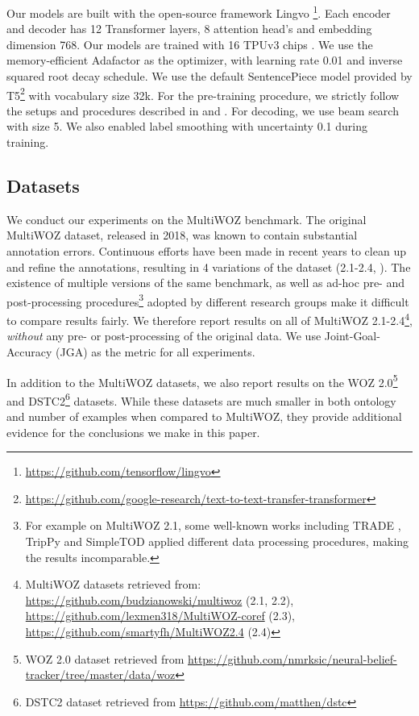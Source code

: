\documentclass[11pt]{article}
\begin{document}
Our models are built with the open-source framework Lingvo \cite{shen2019lingvo}\footnote{\url{https://github.com/tensorflow/lingvo}}. Each encoder and decoder has 12 Transformer layers, 8 attention head's and embedding dimension 768. Our models are trained with 16 TPUv3 chips \cite{jouppi17indata}. We use the memory-efficient Adafactor \cite{pmlr-v80-shazeer18a} as the optimizer, with learning rate 0.01 and inverse squared root decay schedule. We use the default SentencePiece model provided by T5\footnote{\url{https://github.com/google-research/text-to-text-transfer-transformer}} with vocabulary size 32k. For the pre-training procedure, we strictly follow the setups and procedures described in \cite{zhang20ae} and \cite{raffel20exploring}.
For decoding, we use beam search with size 5. We also enabled label smoothing with uncertainty 0.1 during training.

\subsection{Datasets}

We conduct our experiments on the MultiWOZ \cite{budzianowski-etal-2018-multiwoz} benchmark. The original MultiWOZ dataset, released in 2018, was known to contain substantial annotation errors. Continuous efforts have been made in recent years to clean up and refine the annotations, resulting in 4 variations of the dataset (2.1-2.4, \citet{eric2019multiwoz,zhang2020multiwoz,han2020multiwoz,ye2021multiwoz}). The existence of multiple versions of the same benchmark, as well as ad-hoc pre- and post-processing procedures\footnote{For example on MultiWOZ 2.1, some well-known works including TRADE \cite{wu-etal-2019-transferable}, TripPy \cite{heck-etal-2020-trippy} and SimpleTOD \cite{hosseiniasl2020simple} applied different data processing procedures, making the results incomparable.} adopted by different research groups make it difficult to compare results fairly. We therefore report results on all of MultiWOZ 2.1-2.4\footnote{MultiWOZ datasets retrieved from: \url{https://github.com/budzianowski/multiwoz} (2.1, 2.2), \url{https://github.com/lexmen318/MultiWOZ-coref} (2.3), \url{https://github.com/smartyfh/MultiWOZ2.4} (2.4)},
\emph{without} any pre- or post-processing of the original data. We use Joint-Goal-Accuracy (JGA) as the metric for all experiments.

In addition to the MultiWOZ datasets, we also report results on the WOZ 2.0\footnote{WOZ 2.0 dataset retrieved from \url{https://github.com/nmrksic/neural-belief-tracker/tree/master/data/woz}} \cite{wen2016networkbased} and DSTC2\footnote{DSTC2 dataset retrieved from \url{https://github.com/matthen/dstc}} \cite{henderson2014second} datasets. While these datasets are much smaller in both ontology and number of examples when compared to MultiWOZ, they provide additional evidence for the conclusions we make in this paper.
\end{document}
